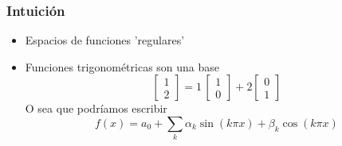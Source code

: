 \documentclass[12pt,aspectratio=169,xcolor=dvipsnames]{beamer}
\begin{document}
\begin{frame}\frametitle{Intuición}
    \begin{itemize}
        \item Espacios de funciones 'regulares'
        \item Funciones trigonométricas son una base
            $$ \begin{bmatrix} 1 \\ 2 \end{bmatrix} = 1 \, \begin{bmatrix} 1 \\ 0\end{bmatrix} + 2 \begin{bmatrix} 0 \\ 1\end{bmatrix} $$
            O sea que podríamos escribir
            $$ f(x) = a_0 + \sum_k \alpha_k \sin (k\pi x) + \beta_k \cos(k \pi x) $$
    \end{itemize}

\end{frame}
\end{document}
